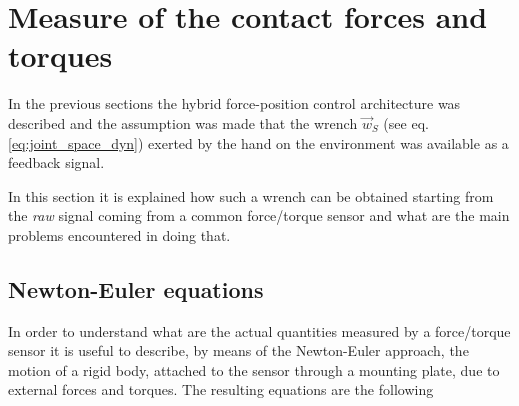 \section{Measure of the contact forces and torques}
In the previous sections the hybrid force-position control architecture was described
and the assumption was made that the wrench $\vec{w}_{S}$ (see eq. \ref{eq:joint_space_dyn})
exerted by the hand on the environment was available as a feedback signal.
\par
In this section it is explained how such a wrench can be obtained starting from the \emph{raw} signal
coming from a common force/torque sensor and what are the main problems encountered in doing that.

\subsection{Newton-Euler equations}
In order to understand what are the actual quantities measured by a force/torque sensor it is useful
to describe, by means of the Newton-Euler approach, the motion of a rigid body, attached to the
sensor through a mounting plate, due to external forces and torques. The resulting equations are the following


